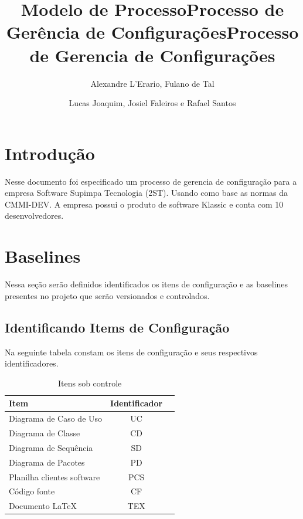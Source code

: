 \documentclass{article}
\title{Modelo de Processo}
\title{Processo de Gerência de Configurações}
\author{Alexandre L'Erario, Fulano de Tal }  	%
\date{}
\title{Processo de Gerencia de Configurações}
\author{Lucas Joaquim, Josiel Faleiros e Rafael Santos }
\begin{document}
	\maketitle
	\newpage
	\tableofcontents
	\newpage
	\section{Introdução}
    Nesse documento foi especificado um processo de gerencia de configuração para a empresa Software Supimpa Tecnologia (2ST). Usando como base as normas da CMMI-DEV. A empresa possui o produto de software Klassic e conta com 10 desenvolvedores.
    \section{Baselines}
	    Nessa seção serão definidos identificados os itens de configuração e as baselines presentes no projeto que serão versionados e controlados.
	    \subsection{Identificando Items de Configuração}
          Na seguinte tabela constam os itens de configuração e seus respectivos identificadores.
	  	\begin{table}[H]
			\begin{tabular}{l c r}
                  \textbf{Item} & \textbf{Identificador}\\
                  \hline
                  Diagrama de Caso de Uso & UC \\
                  Diagrama de Classe & CD \\
                  Diagrama de Sequência  & SD \\
                  Diagrama de Pacotes  & PD \\
                  Planilha clientes software & PCS\\
                  Código fonte  & CF\\
                  Documento LaTeX & TEX \\
              \end{tabular}\\
              \caption{Itens sob controle}
          \end{table}
\end{document}
